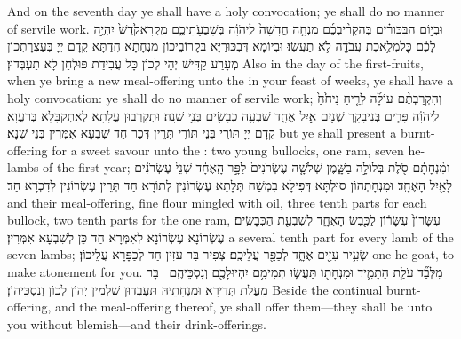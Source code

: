 {And on the seventh day ye shall have a holy convocation; ye shall do no manner of servile work.}{}
{וּבְי֣וֹם הַבִּכּוּרִ֗ים בְּהַקְרִ֨יבְכֶ֜ם מִנְחָ֤ה חֲדָשָׁה֙ לַֽיהֹוָ֔ה בְּשָׁבֻעֹ֖תֵיכֶ֑ם מִֽקְרָא\maqqaf קֹ֙דֶשׁ֙ יִהְיֶ֣ה לָכֶ֔ם כׇּל\maqqaf מְלֶ֥אכֶת עֲבֹדָ֖ה לֹ֥א תַעֲשֽׂוּ׃}
{וּבְיוֹמָא דְּבִכּוּרַיָּא בְּקָרוֹבֵיכוֹן מִנְחָתָא חֲדַתָּא קֳדָם יְיָ בְּעַצְרָתְכוֹן מְעָרַע קַדִּישׁ יְהֵי לְכוֹן כָּל עֲבִידַת פּוּלְחַן לָא תַעְבְּדוּן׃}
{Also in the day of the first-fruits, when ye bring a new meal-offering unto the \lord\space in your feast of weeks, ye shall have a holy convocation: ye shall do no manner of servile work;}{}
{וְהִקְרַבְתֶּ֨ם עוֹלָ֜ה לְרֵ֤יחַ נִיחֹ֙חַ֙ לַֽיהֹוָ֔ה פָּרִ֧ים בְּנֵי\maqqaf בָקָ֛ר שְׁנַ֖יִם אַ֣יִל אֶחָ֑ד שִׁבְעָ֥ה כְבָשִׂ֖ים בְּנֵ֥י שָׁנָֽה׃}
{וּתְקָרְבוּן עֲלָתָא לְאִתְקַבָּלָא בְּרַעֲוָא קֳדָם יְיָ תּוֹרֵי בְּנֵי תּוֹרֵי תְּרֵין דְּכַר חַד שִׁבְעָא אִמְּרִין בְּנֵי שְׁנָא׃}
{but ye shall present a burnt-offering for a sweet savour unto the \lord: two young bullocks, one ram, seven he-lambs of the first year;}{}
{וּמִ֨נְחָתָ֔ם סֹ֖לֶת בְּלוּלָ֣ה בַשָּׁ֑מֶן שְׁלֹשָׁ֤ה עֶשְׂרֹנִים֙ לַפָּ֣ר הָֽאֶחָ֔ד שְׁנֵי֙ עֶשְׂרֹנִ֔ים לָאַ֖יִל הָאֶחָֽד׃}
{וּמִנְחָתְהוֹן סוּלְתָּא דְּפִילָא בִמְשַׁח תְּלָתָא עֶשְׂרוֹנִין לְתוֹרָא חַד תְּרֵין עֶשְׂרוֹנִין לְדִכְרָא חַד׃}
{and their meal-offering, fine flour mingled with oil, three tenth parts for each bullock, two tenth parts for the one ram,}{}
{עִשָּׂרוֹן֙ עִשָּׂר֔וֹן לַכֶּ֖בֶשׂ הָאֶחָ֑ד לְשִׁבְעַ֖ת הַכְּבָשִֽׂים׃}
{עֶשְׂרוֹנָא עֶשְׂרוֹנָא לְאִמְּרָא חַד כֵּן לְשִׁבְעָא אִמְּרִין׃}
{a several tenth part for every lamb of the seven lambs;}{}
{שְׂעִ֥יר עִזִּ֖ים אֶחָ֑ד לְכַפֵּ֖ר עֲלֵיכֶֽם׃}
{צְפִיר בַּר עִזִּין חַד לְכַפָּרָא עֲלֵיכוֹן׃}
{one he-goat, to make atonement for you.}{}
{מִלְּבַ֞ד עֹלַ֧ת הַתָּמִ֛יד וּמִנְחָת֖וֹ תַּעֲשׂ֑וּ תְּמִימִ֥ם יִהְיוּ\maqqaf לָכֶ֖ם וְנִסְכֵּיהֶֽם׃ \petucha }
{בָּר מֵעֲלַת תְּדִירָא וּמִנְחָתֵיהּ תַּעְבְּדוּן שַׁלְמִין יְהוֹן לְכוֹן וְנִסְכֵּיהוֹן׃}
{Beside the continual burnt-offering, and the meal-offering thereof, ye shall offer them—they shall be unto you without blemish—and their drink-offerings.}{}
